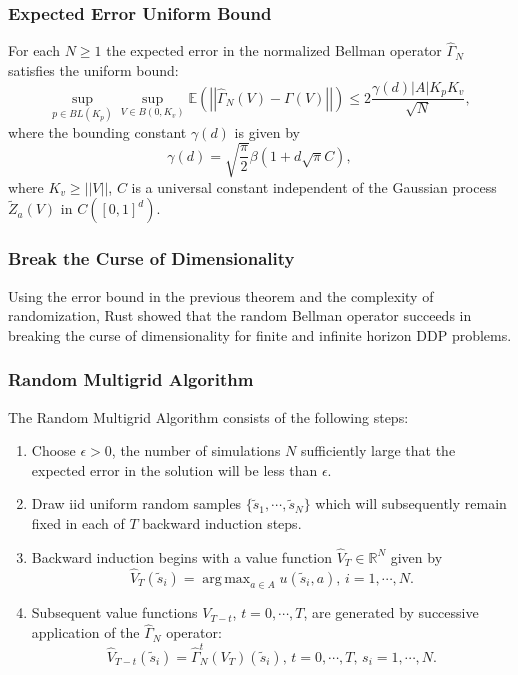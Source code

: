 \documentclass{beamer}
\DeclareMathOperator*{\argmax}{arg\,max}
\begin{document}
\begin{frame}[fragile]
\frametitle{Expected Error Uniform Bound}

\begin{corollary}
For each $N\geq1$ the expected error in the normalized Bellman operator $\widehat{\Gamma}_N$ satisfies the uniform bound:
\[
\sup_{p\in BL(K_p)}\sup_{V\in B(0, K_v)}\mathbb{E}\left(\left|\left|\widehat{\Gamma}_N(V)-\Gamma(V)\right|\right|\right)\leq2\frac{\gamma(d)|A|K_pK_v}{\sqrt{N}},
\]
where the bounding constant $\gamma(d)$ is given by
\[
\gamma(d)=\sqrt{\frac{\pi}{2}}\beta(1+d\sqrt{\pi}C),
\]
where $K_v\geq||V||$, $C$ is a universal constant independent of the Gaussian process $\widetilde{Z}_a(V)$ in $C([0, 1]^d)$.
\end{corollary}
\end{frame}

\begin{frame}[fragile]
\frametitle{Break the Curse of Dimensionality}

Using the error bound in the previous theorem and the complexity of randomization, Rust showed that the random Bellman operator succeeds in breaking the curse of dimensionality for finite and infinite horizon DDP problems.
\end{frame}

\begin{frame}[fragile]
\frametitle{Random Multigrid Algorithm}

The Random Multigrid Algorithm consists of the following steps:
\begin{enumerate}
\item Choose $\epsilon>0$, the number of simulations $N$ sufficiently large that the expected error in the solution will be less than $\epsilon$.
\item Draw iid uniform random samples $\{\widetilde{s}_1, \cdots, \widetilde{s}_N\}$ which will subsequently remain fixed in each of $T$ backward induction steps.
\item Backward induction begins with a value function $\widehat{V}_T\in\mathbb{R}^N$ given by
\[
\widehat{V}_T(\widetilde{s}_i)=\argmax_{a\in A}u(\widetilde{s}_i, a),\, i=1, \cdots, N.
\]
\item Subsequent value functions $V_{T-t}$, $t=0, \cdots, T$, are generated by successive application of the $\widehat{\Gamma}_N$ operator:
\[
\widehat{V}_{T-t}(\widetilde{s}_i)=\widehat{\Gamma}_N^t(V_T)(\widetilde{s}_i),\, t=0, \cdots, T, \, s_i=1, \cdots, N.
\]
\end{enumerate}
\end{frame}
\end{document}

